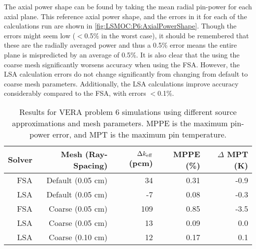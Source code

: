 {{{      The axial power shape can be found by taking the mean radial pin-power for each axial plane.
      This reference axial power shape, and the errors in it for each of the calculations run are shown in \cref{fig:LSMOC:P6:AxialPowerShape}.
      Though the errors might seem low ($<$0.5\% in the worst case), it should be remembered that these are the radially averaged power and thus a 0.5\% error means the entire plane is mispredicted by an average of 0.5\%.
      It is also clear that the using the coarse mesh significantly worsens accuracy when using the \ac{FSA}.
      However, the \ac{LSA} calculation errors do not change significantly from changing from default to coarse mesh parameters.
      Additionally, the \ac{LSA} calculations improve accuracy considerably compared to the \ac{FSA}, with errors $<$0.1\%.

      \begin{table}[htbp]
        \centering
        \caption{
          Results for VERA problem 6 simulations using different source approximations and mesh parameters.
          MPPE is the maximum pin-power error, and MPT is the maximum pin temperature.}
        \label{tab:LSMOC:P6:Results}
        \begin{tabular}{rrrrr}\toprule
          Solver & Mesh (Ray-Spacing) & $\Delta k_{\text{eff}}$ (pcm) & MPPE (\%) & $\Delta$ MPT (K)\\\midrule
          FSA    & Default (0.05 cm)  & 34    & 0.31 & -0.9\\
          LSA    & Default (0.05 cm)  & -7    & 0.08 & -0.3\\
          FSA    & Coarse  (0.05 cm)  & 109   & 0.85 & -3.5\\
          LSA    & Coarse  (0.05 cm)  & 13    & 0.09 &  0.0\\
          LSA    & Coarse  (0.10 cm)  & 12    & 0.17 &  0.1\\\bottomrule
        \end{tabular}
      \end{table}

}}}
